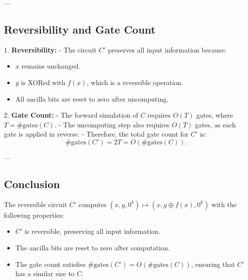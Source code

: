 \documentclass[12pt,letterpaper]{article}
\begin{document}
---

\subsection*{Reversibility and Gate Count}

1. \textbf{Reversibility:}
   - The circuit \( C' \) preserves all input information because:
     \begin{itemize}
         \item \( x \) remains unchanged.
         \item \( y \) is XORed with \( f(x) \), which is a reversible operation.
         \item All ancilla bits are reset to zero after uncomputing.
     \end{itemize}

2. \textbf{Gate Count:}
   - The forward simulation of \( C \) requires \( O(T) \) gates, where \( T = \#\text{gates}(C) \).
   - The uncomputing step also requires \( O(T) \) gates, as each gate is applied in reverse.
   - Therefore, the total gate count for \( C' \) is:
     \[
     \#\text{gates}(C') = 2T = O(\#\text{gates}(C)).
     \]

---

\subsection*{Conclusion}

The reversible circuit \( C' \) computes \( (x, y, 0^k) \mapsto (x, y \oplus f(x), 0^k) \) with the following properties:
\begin{itemize}
    \item \( C' \) is reversible, preserving all input information.
    \item The ancilla bits are reset to zero after computation.
    \item The gate count satisfies \( \#\text{gates}(C') = O(\#\text{gates}(C)) \), ensuring that \( C' \) has a similar size to \( C \).
\end{itemize}
\end{document}
